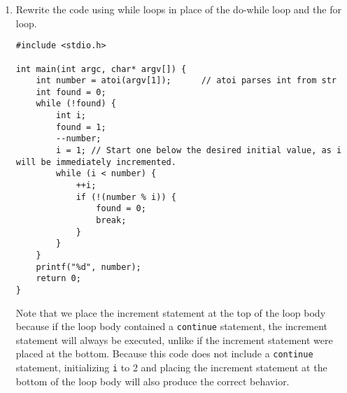 \begin{enumerate}
\item Rewrite the code using while loops in place of the do-while loop and the for loop.

\begin{answer}
\begin{verbatim}
#include <stdio.h>

int main(int argc, char* argv[]) {
    int number = atoi(argv[1]);      // atoi parses int from str
    int found = 0;
    while (!found) {
        int i; 
        found = 1;
        --number;
        i = 1; // Start one below the desired initial value, as i will be immediately incremented.
        while (i < number) {
            ++i;
            if (!(number % i)) {
                found = 0;
                break;
            }
        }
    }
    printf("%d", number);
    return 0;
}
\end{verbatim}

Note that we place the increment statement at the top of the loop body because if the loop body contained a \texttt{continue} statement, the increment statement will always be executed, unlike if the increment statement were placed at the bottom. Because this code does not include a \texttt{continue} statement, initializing \texttt{i} to 2 and placing the increment statement at the bottom of the loop body will also produce the correct behavior.
\end{answer}

\end{enumerate}
